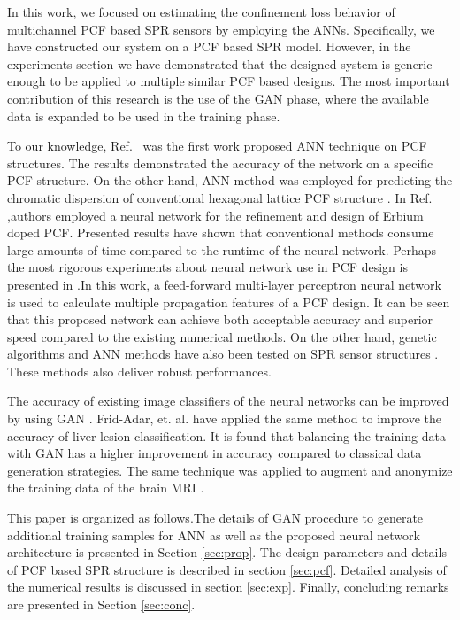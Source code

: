 \documentclass[journal]{IEEEtran}
\begin{document}
In this work, we focused on estimating the confinement loss behavior of multichannel PCF based SPR sensors by employing the ANNs. Specifically, we have constructed our system on a PCF based SPR model. However, in the experiments section we have demonstrated that the designed system is generic enough to be applied to multiple similar PCF based designs. The most important contribution of this research is the use of the GAN phase, where the available data is expanded to be used in the training phase.

To our knowledge, Ref.~\cite{hameed2008accurate} was the first work proposed ANN technique on PCF structures. The results demonstrated the accuracy of the network on a specific PCF structure. On the other hand, ANN method was employed for predicting the chromatic dispersion of conventional hexagonal lattice PCF structure \cite{rodriguez2010efficient}. In Ref. \cite{mescia2011refinement},authors employed a neural network for the refinement and design of Erbium doped PCF. Presented results have shown that conventional methods consume large amounts of time compared to the runtime of the neural network. Perhaps the most rigorous experiments about neural network use in PCF design is presented in  \cite{paper0}.In this work, a feed-forward multi-layer perceptron neural network is used to calculate multiple propagation features of a PCF design. It can be seen that this proposed network can achieve both acceptable accuracy and superior speed compared to the existing numerical methods. On the other hand, genetic algorithms and ANN methods have also been tested on SPR sensor structures \cite{fu2018optimization,mcatee2019artificial}. These methods also deliver robust performances.

The accuracy of existing image classifiers of the neural networks can be improved by using GAN  \cite{perez2017effectiveness}. Frid-Adar, et. al. \cite{frid2018synthetic} have applied the same method to improve the accuracy of liver lesion classification. It is found that balancing the training data with GAN has a higher improvement in accuracy compared to classical data generation strategies. The same technique was applied to augment and anonymize the training data of the brain MRI  \cite{shin2018medical}.


This paper is organized as follows.The details of GAN procedure to generate additional training samples for ANN as well as the proposed neural network architecture is presented in Section \ref{sec:prop}. The design parameters and details of PCF based SPR structure is described in section \ref{sec:pcf}. Detailed analysis of the numerical results is discussed in section \ref{sec:exp}. Finally, concluding remarks are presented in Section \ref{sec:conc}.
\end{document}
